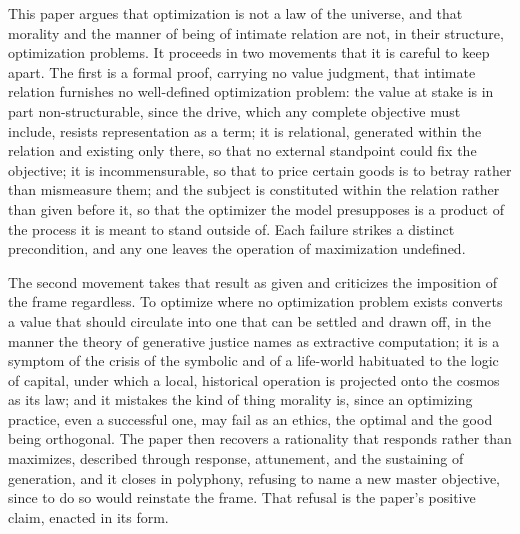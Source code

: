 This paper argues that optimization is not a law of the universe, and that morality and the manner of being of intimate relation are not, in their structure, optimization problems. It proceeds in two movements that it is careful to keep apart. The first is a formal proof, carrying no value judgment, that intimate relation furnishes no well-defined optimization problem: the value at stake is in part non-structurable, since the drive, which any complete objective must include, resists representation as a term; it is relational, generated within the relation and existing only there, so that no external standpoint could fix the objective; it is incommensurable, so that to price certain goods is to betray rather than mismeasure them; and the subject is constituted within the relation rather than given before it, so that the optimizer the model presupposes is a product of the process it is meant to stand outside of. Each failure strikes a distinct precondition, and any one leaves the operation of maximization undefined.

The second movement takes that result as given and criticizes the imposition of the frame regardless. To optimize where no optimization problem exists converts a value that should circulate into one that can be settled and drawn off, in the manner the theory of generative justice names as extractive computation; it is a symptom of the crisis of the symbolic and of a life-world habituated to the logic of capital, under which a local, historical operation is projected onto the cosmos as its law; and it mistakes the kind of thing morality is, since an optimizing practice, even a successful one, may fail as an ethics, the optimal and the good being orthogonal. The paper then recovers a rationality that responds rather than maximizes, described through response, attunement, and the sustaining of generation, and it closes in polyphony, refusing to name a new master objective, since to do so would reinstate the frame. That refusal is the paper's positive claim, enacted in its form.
